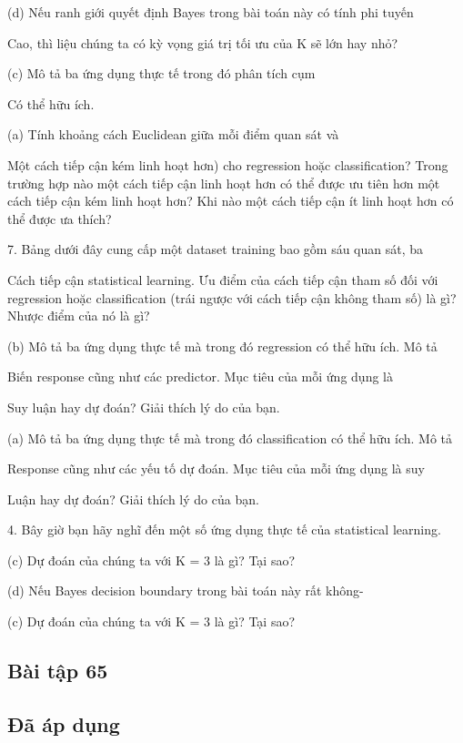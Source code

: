 (d) Nếu ranh giới quyết định Bayes trong bài toán này có tính phi tuyến

Cao, thì liệu chúng ta có kỳ vọng giá trị tối ưu của K sẽ lớn hay nhỏ?

(c) Mô tả ba ứng dụng thực tế trong đó phân tích cụm

Có thể hữu ích.

(a) Tính khoảng cách Euclidean giữa mỗi điểm quan sát và

Một cách tiếp cận kém linh hoạt hơn) cho regression hoặc classification? Trong trường hợp nào một cách tiếp cận linh hoạt hơn có thể được ưu tiên hơn một cách tiếp cận kém linh hoạt hơn? Khi nào một cách tiếp cận ít linh hoạt hơn có thể được ưa thích?

7. Bảng dưới đây cung cấp một dataset training bao gồm sáu quan sát, ba

Cách tiếp cận statistical learning. Ưu điểm của cách tiếp cận tham số đối với regression hoặc classification (trái ngược với cách tiếp cận không tham số) là gì? Nhược điểm của nó là gì?

(b) Mô tả ba ứng dụng thực tế mà trong đó regression có thể hữu ích. Mô tả

Biến response cũng như các predictor. Mục tiêu của mỗi ứng dụng là

Suy luận hay dự đoán? Giải thích lý do của bạn.

(a) Mô tả ba ứng dụng thực tế mà trong đó classification có thể hữu ích. Mô tả

Response cũng như các yếu tố dự đoán. Mục tiêu của mỗi ứng dụng là suy

Luận hay dự đoán? Giải thích lý do của bạn.

4. Bây giờ bạn hãy nghĩ đến một số ứng dụng thực tế của statistical learning.

(c) Dự đoán của chúng ta với K = 3 là gì? Tại sao?

(d) Nếu Bayes decision boundary trong bài toán này rất không-

(c) Dự đoán của chúng ta với K = 3 là gì? Tại sao?

\subsection{Bài tập 65}

\subsection{Đã áp dụng}

